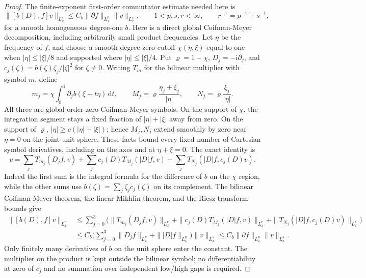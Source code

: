 \documentclass[11pt,a4paper]{article}
\numberwithin{equation}{section}
\newcommand{\dd}{\mathrm d}
\newcommand{\f}[2]{\frac{#1}{#2}}
\newcommand{\ii}{\mathrm{i}}
\theoremstyle{definition}
\begin{document}
\begin{proof}
The finite-exponent first-order commutator estimate needed here is
\begin{equation*}
\|[b(D),f]v\|_{L^r_x}\leq C_b\|\partial f\|_{L^p_x}\|v\|_{L^s_x},
\qquad 1<p,s,r<\infty,\qquad r^{-1}=p^{-1}+s^{-1},
\end{equation*}
for a smooth homogeneous degree-one $b$. Here is a direct global
Coifman-Meyer decomposition, including arbitrarily small product
frequencies. Let $\eta$ be the frequency of $f$, and choose a smooth
degree-zero cutoff $\chi(\eta,\xi)$ equal to one when
$|\eta|\leq|\xi|/8$ and supported where $|\eta|\leq|\xi|/4$.
Put $\varrho=1-\chi$, $D_j=-\ii \partial_j$, and
$c_j(\zeta)=b(\zeta)\zeta_j/|\zeta|^2$ for $\zeta\ne0$.
Writing $T_m$ for the bilinear multiplier with symbol $m$, define
\begin{equation*}
 m_j=\chi\int_0^1\partial_jb(\xi+t\eta)\,\dd t,
 \qquad M_j=\varrho\f{\eta_j+\xi_j}{|\eta|},
 \qquad N_j=\varrho\f{\xi_j}{|\eta|}.
\end{equation*}
All three are global order-zero Coifman-Meyer symbols. On the support
of $\chi$, the integration segment stays a fixed fraction of
$|\eta|+|\xi|$ away from zero. On the support of $\varrho$,
$|\eta|\geq c(|\eta|+|\xi|)$; hence $M_j,N_j$ extend smoothly by zero
near $\eta=0$ on the joint unit sphere. These facts bound every fixed
number of Cartesian symbol derivatives, including on the axes and at
$\eta+\xi=0$. The exact identity is
\begin{equation*}
[b(D),f]v
=\sum_j T_{m_j}(D_jf,v)
 +\sum_j c_j(D)T_{M_j}(|D|f,v)
 -\sum_j T_{N_j}(|D|f,c_j(D)v).
\end{equation*}
Indeed the first sum is the integral formula for the difference of
$b$ on the $\chi$ region, while the other sums use
$b(\zeta)=\sum_j\zeta_jc_j(\zeta)$ on its complement.
The bilinear Coifman-Meyer theorem, the linear Mikhlin theorem,
and the Riesz-transform bounds give
\begin{equation*}
\begin{aligned}
\|[b(D),f]v\|_{L^r_x}
&\leq\sum_{j=0}^3\bigg(
 \|T_{m_j}(D_jf,v)\|_{L^r_x}
 +\|c_j(D)T_{M_j}(|D|f,v)\|_{L^r_x}
 +\|T_{N_j}(|D|f,c_j(D)v)\|_{L^r_x}\bigg)\\
&\leq C_b\bigg(\sum_{j=0}^3\|D_jf\|_{L^p_x}
                   +\||D|f\|_{L^p_x}\bigg)\|v\|_{L^s_x}
 \leq C_b\|\partial f\|_{L^p_x}\|v\|_{L^s_x}.
\end{aligned}
\end{equation*}
Only finitely many derivatives of $b$ on the unit sphere enter the
constant. The multiplier on the product is kept outside the bilinear symbol;
no differentiability at zero of $c_j$ and no summation over independent
low/high gaps is required.


\end{proof}
\end{document}
